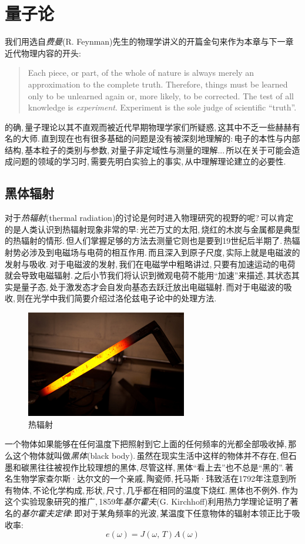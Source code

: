 \chapter{量子论}

我们用选自\emph{费曼}(R. Feynman)先生的物理学讲义的开篇金句来作为本章与下一章近代物理内容的开头:
\begin{quote}
Each piece, or part, of the whole of nature is always merely an approximation to the complete truth. Therefore, things must be learned only to be unlearned again or, more likely, to be corrected. The test of all knowledge is \emph{experiment}. Experiment is the sole judge of scientific ``truth''.
\end{quote}

的确,\,量子理论以其不直观而被近代早期物理学家们所疑惑,\,这其中不乏一些赫赫有名的大师.\,直到现在也有很多基础的问题是没有被深刻地理解的:\,电子的本性与内部结构,\,基本粒子的类别与参数,\,对量子非定域性与测量的理解...\,所以在关于可能会造成问题的领域的学习时,\,需要先明白实验上的事实,\,从中理解理论建立的必要性.


\section{黑体辐射}

对于\emph{热辐射}(thermal radiation)的讨论是何时进入物理研究的视野的呢?\,可以肯定的是人类认识到热辐射现象非常的早:\,光芒万丈的太阳,\,烧红的木炭与金属都是典型的热辐射的情形.\,但人们掌握足够的方法去测量它则也是要到19世纪后半期了.\,热辐射势必涉及到电磁场与电荷的相互作用.\,而且深入到原子尺度,\,实际上就是电磁波的发射与吸收.\,对于电磁波的发射,\,我们在电磁学中粗略讲过,\,只要有加速运动的电荷就会导致电磁辐射.\,之后小节我们将认识到微观电荷不能用``加速''来描述,\,其状态其实是量子态,\,处于激发态才会自发向基态去跃迁放出电磁辐射.\,而对于电磁波的吸收,\,则在光学中我们简要介绍过洛伦兹电子论中的处理方法.\,

\begin{figure}
\centering
\vspace{-15pt}
\includegraphics[width=7cm]{image/19-1-1.jpg}
\caption{热辐射}
\end{figure}
一个物体如果能够在任何温度下把照射到它上面的任何频率的光都全部吸收掉,\,那么这个物体就叫做\emph{黑体}(black body).\,虽然在现实生活中这样的物体并不存在,\,但石墨和碳黑往往被视作比较理想的黑体,\,尽管这样,\,黑体``看上去''也不总是``黑的''.\,著名生物学家查尔斯·达尔文的一个亲戚,\,陶瓷师,\,托马斯·玮致活在1792年注意到所有物体,\,不论化学构成,\,形状,\,尺寸,\,几乎都在相同的温度下烧红.\,黑体也不例外.\,作为这个实验现象研究的推广,\,1859年\emph{基尔霍夫}(G. Kirchhoff)利用热力学理论证明了著名的\emph{基尔霍夫定律}:\,即对于某角频率的光波,\,某温度下任意物体的辐射本领正比于吸收率:
\[e(\omega)=J(\omega,\,T)A(\omega)\]

